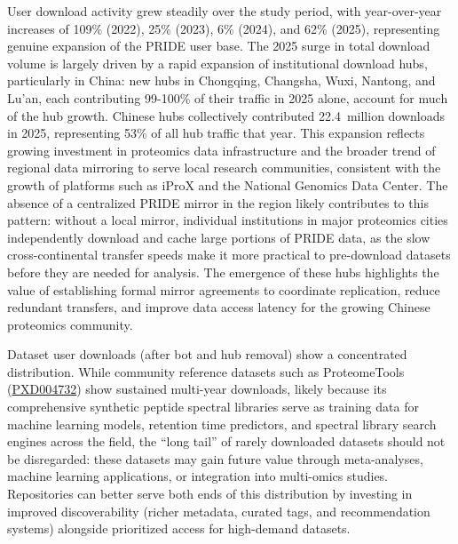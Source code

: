 \documentclass[11pt,a4paper]{article}
\begin{document}
\begin{sloppypar}
User download activity grew steadily over the study period, with year-over-year increases of 109\% (2022), 25\% (2023), 6\% (2024), and 62\% (2025), representing genuine expansion of the PRIDE user base. The 2025 surge in total download volume is largely driven by a rapid expansion of institutional download hubs, particularly in China: new hubs in Chongqing, Changsha, Wuxi, Nantong, and Lu'an, each contributing 99-100\% of their traffic in 2025 alone, account for much of the hub growth. Chinese hubs collectively contributed 22.4~million downloads in 2025, representing 53\% of all hub traffic that year. This expansion reflects growing investment in proteomics data infrastructure and the broader trend of regional data mirroring to serve local research communities, consistent with the growth of platforms such as iProX \citep{Chen2022iProX} and the National Genomics Data Center. The absence of a centralized PRIDE mirror in the region likely contributes to this pattern: without a local mirror, individual institutions in major proteomics cities independently download and cache large portions of PRIDE data, as the slow cross-continental transfer speeds make it more practical to pre-download datasets before they are needed for analysis. The emergence of these hubs highlights the value of establishing formal mirror agreements to coordinate replication, reduce redundant transfers, and improve data access latency for the growing Chinese proteomics community.

Dataset user downloads (after bot and hub removal) show a concentrated distribution. While community reference datasets such as ProteomeTools (\href{https://www.ebi.ac.uk/pride/archive/projects/PXD004732}{PXD004732}) show sustained multi-year downloads, likely because its comprehensive synthetic peptide spectral libraries serve as training data for machine learning models, retention time predictors, and spectral library search engines across the field, the ``long tail'' of rarely downloaded datasets should not be disregarded: these datasets may gain future value through meta-analyses, machine learning applications, or integration into multi-omics studies. Repositories can better serve both ends of this distribution by investing in improved discoverability (richer metadata, curated tags, and recommendation systems) alongside prioritized access for high-demand datasets.


\end{sloppypar}
\end{document}
